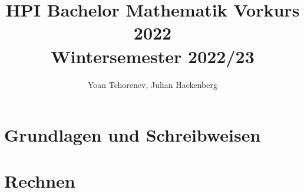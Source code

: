 \documentclass[12pt,a4paper]{article}
\title{%
    HPI Bachelor Mathematik Vorkurs 2022 \\
    \large Wintersemester 2022/23 \\
}
\author{Yoan Tchorenev, Julian Hackenberg}
\begin{document}
    \begin{titlepage}
        \maketitle
        \thispagestyle{empty}
    \end{titlepage}

    \tableofcontents
    \newpage
    
    \part{Grundlagen und Schreibweisen}\label{part:grundlagen-und-schreibweisen}
    

    \part{Rechnen}\label{part:rechnen}
    
\end{document}
